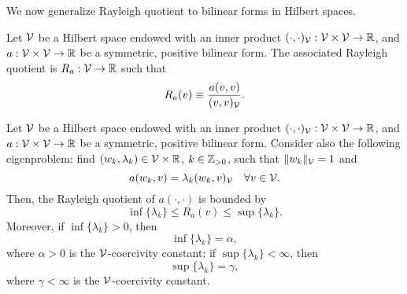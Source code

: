 We now generalize Rayleigh quotient to bilinear forms in Hilbert spaces.
\begin{definition}
  Let $\mathcal{V}$ be a Hilbert space endowed with an inner product $(\cdot,\cdot)_{\mathcal{V}} : \mathcal{V} \times \mathcal{V} \to \mathbb{R}$, and $a: \mathcal{V} \times \mathcal{V} \to \mathbb{R}$ be a symmetric, positive bilinear form.  The associated Rayleigh quotient is $R_a: \mathcal{V} \to \mathbb{R}$ such that
  \begin{equation*}
    R_a(v) \equiv \frac{a(v,v)}{(v,v)_{\mathcal{V}}}.
  \end{equation*}
\end{definition}
\begin{proposition}
  Let $\mathcal{V}$ be a Hilbert space endowed with an inner product $(\cdot,\cdot)_{\mathcal{V}} : \mathcal{V} \times \mathcal{V} \to \mathbb{R}$, and $a: \mathcal{V} \times \mathcal{V} \to \mathbb{R}$ be a symmetric, positive bilinear form. Consider also the following eigenproblem: find $(w_k,\lambda_k) \in \mathcal{V} \times \mathbb{R}$, $k \in \mathbb{Z}_{> 0}$, such that $\| w_k \|_{\mathcal{V}} = 1$ and 
  \begin{equation*}
    a(w_k,v) = \lambda_k (w_k,v)_{\mathcal{V}} \quad \forall v \in \mathcal{V}.
  \end{equation*}
  Then, the Rayleigh quotient of $a(\cdot,\cdot)$ is bounded by
  \begin{equation*}
    \inf \{ \lambda_k \} \leq R_a(v) \leq \sup \{ \lambda_k \} .
  \end{equation*}
  Moreover, if $\inf \{\lambda_k \} > 0$, then 
  \begin{equation*}
    \inf \{\lambda_k\} = \alpha,
  \end{equation*}
  where $\alpha > 0$ is the $\mathcal{V}$-coercivity constant; if $\sup \{ \lambda_k \} < \infty$, then
  \begin{equation*}
    \sup \{\lambda_k \} = \gamma,
  \end{equation*}
  where $\gamma < \infty$ is the $\mathcal{V}$-coercivity constant.

\end{proposition}
